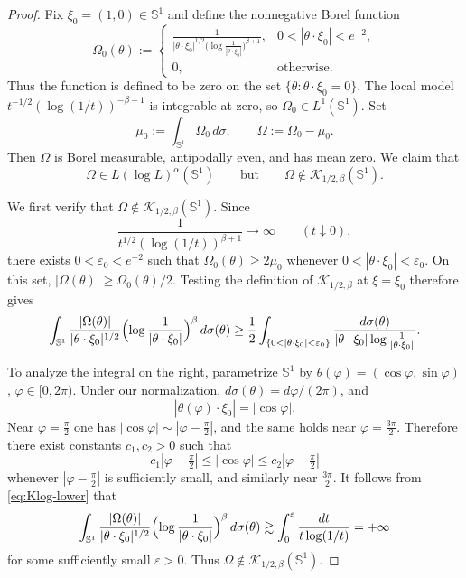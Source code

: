\documentclass[11pt]{amsart}
\theoremstyle{remark}
\numberwithin{equation}{section}
\newcommand{\Sph}{\mathbb S^1}
\newcommand{\cK}{\mathcal K}
\begin{document}
	\begin{proof}
		Fix \(\xi_0=(1,0)\in\Sph\) and define the nonnegative Borel function
		\begin{equation}\label{eq:Orlicz-not-Klog-example}
			\Omega_0(\theta)
			:=
			\begin{cases}
				\displaystyle
				\frac{1}
				{|\theta\cdot\xi_0|^{1/2}
					\bigl(\log \frac1{|\theta\cdot\xi_0|}\bigr)^{\beta+1}},
				&0<|\theta\cdot\xi_0|<e^{-2},\\[6pt]
				0,&\text{otherwise}.
			\end{cases}
		\end{equation}
		Thus the function is defined to be zero on the set
		\(\{\theta:\theta\cdot\xi_0=0\}\).
		The local model
		\(t^{-1/2}(\log(1/t))^{-\beta-1}\) is integrable at zero, so
		\(\Omega_0\in L^1(\Sph)\). Set
		\[
		\mu_0:=\int_{\Sph}\Omega_0\,d\sigma,
		\qquad
		\Omega:=\Omega_0-\mu_0.
		\]
		Then \(\Omega\) is Borel measurable, antipodally even, and has mean zero. We
		claim that
		\[
		\Omega\in L(\log L)^\alpha(\Sph)
		\qquad\text{but}\qquad
		\Omega\notin \cK_{1/2,\beta}(\Sph).
		\]
		
		We first verify that \(\Omega\notin \cK_{1/2,\beta}(\Sph)\).
		Since
		\[
		\frac1{t^{1/2}(\log(1/t))^{\beta+1}}\longrightarrow\infty
		\qquad (t\downarrow0),
		\]
		there exists \(0<\varepsilon_0<e^{-2}\) such that
		\(\Omega_0(\theta)\ge2\mu_0\) whenever
		\(0<|\theta\cdot\xi_0|<\varepsilon_0\). On this set,
		\(|\Omega(\theta)|\ge\Omega_0(\theta)/2\). Testing the definition of
		\(\cK_{1/2,\beta}\) at \(\xi=\xi_0\) therefore gives
		\begin{equation}\label{eq:Klog-lower}
			\int_{\Sph}
			\frac{|\Omega(\theta)|}{|\theta\cdot\xi_0|^{1/2}}
			\Bigl(\log\frac1{|\theta\cdot\xi_0|}\Bigr)^\beta
			\,d\sigma(\theta)
			\ge
			\frac12\int_{\{0<|\theta\cdot\xi_0|<\varepsilon_0\}}
			\frac{d\sigma(\theta)}{|\theta\cdot\xi_0|
				\log\frac1{|\theta\cdot\xi_0|}}.
		\end{equation}
		
		To analyze the integral on the right, parametrize \(\Sph\) by
		\(\theta(\varphi)=(\cos\varphi,\sin\varphi)\), \(\varphi\in[0,2\pi)\).
		Under our normalization, \(d\sigma(\theta)=d\varphi/(2\pi)\), and
		\[
		|\theta(\varphi)\cdot\xi_0|=|\cos\varphi|.
		\]
		Near \(\varphi=\frac\pi2\) one has \(|\cos\varphi|\sim|\varphi-\frac\pi2|\), and
		the same holds near \(\varphi=\frac{3\pi}{2}\). Therefore there exist constants
		\(c_1,c_2>0\) such that
		\[
		c_1|\varphi-\tfrac\pi2|\le |\cos\varphi|\le c_2|\varphi-\tfrac\pi2|
		\]
		whenever \(|\varphi-\frac\pi2|\) is sufficiently small, and similarly near
		\(\frac{3\pi}{2}\). It follows from \eqref{eq:Klog-lower} that
		\[
		\int_{\Sph}
		\frac{|\Omega(\theta)|}{|\theta\cdot\xi_0|^{1/2}}
		\Bigl(\log\frac1{|\theta\cdot\xi_0|}\Bigr)^\beta
		\,d\sigma(\theta)
		\gtrsim
		\int_0^\varepsilon \frac{dt}{t\log(1/t)}
		=+\infty
		\]
		for some sufficiently small \(\varepsilon>0\). Thus
		\(\Omega\notin \cK_{1/2,\beta}(\Sph)\).
		

\end{proof}
\end{document}
